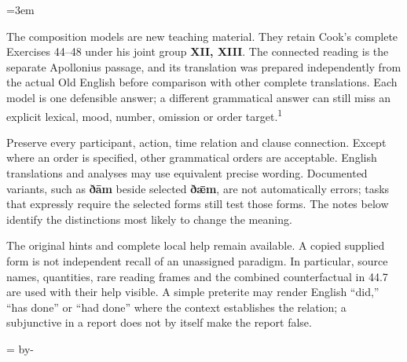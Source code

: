 \newcommand{\runningtitle}{Unit 18. Answer key}

\emergencystretch=3em
\newcommand{\itempara}[2]{\par\addvspace{3pt}\noindent\hangindent=1.8em\hangafter=1\makebox[1.8em][l]{#1.}#2\par}
\newcommand{\reserve}[1]{\par\penalty-100\begingroup\dimen0=\pagegoal\advance\dimen0 by-\pagetotal\ifdim\dimen0<#1\newpage\fi\endgroup}

\raggedright
{}

The composition models are new teaching material. They retain Cook’s complete Exercises 44–48 under his joint group \textbf{XII, XIII}. The connected reading is the separate Apollonius passage, and its translation was prepared independently from the actual Old English before comparison with other complete translations. Each model is one defensible answer; a different grammatical answer can still miss an explicit lexical, mood, number, omission or order target.\textsuperscript{1}

Preserve every participant, action, time relation and clause connection. Except where an order is specified, other grammatical orders are acceptable. English translations and analyses may use equivalent precise wording. Documented variants, such as \textbf{ðām} beside selected \textbf{ðǣm}, are not automatically errors; tasks that expressly require the selected forms still test those forms. The notes below identify the distinctions most likely to change the meaning.

The original hints and complete local help remain available. A copied supplied form is not independent recall of an unassigned paradigm. In particular, source names, quantities, rare reading frames and the combined counterfactual in 44.7 are used with their help visible. A simple preterite may render English “did,” “has done” or “had done” where the context establishes the relation; a subjunctive in a report does not by itself make the report false.

\reserve{7\baselineskip}
